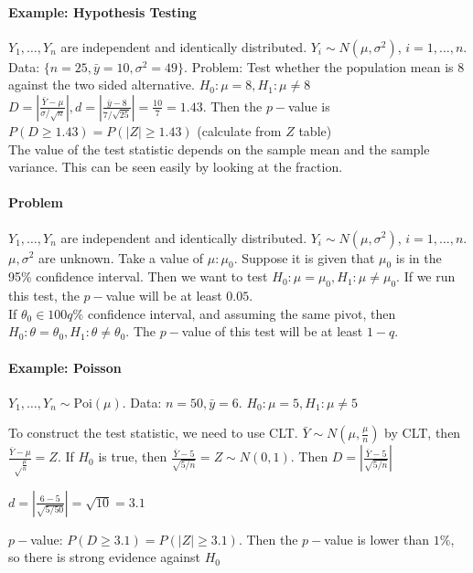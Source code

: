 \documentclass[10pt,letter]{article}
\theoremstyle{plain}
\theoremstyle{definition}
\begin{document}
\paragraph{Example: Hypothesis Testing}
$Y_1,\ldots,Y_n$ are independent and identically distributed. $Y_i\sim N(\mu,\sigma^2)$, $i=1,\ldots,n$. Data: $\lbrace n=25,\bar{y}=10,\sigma^2=49\rbrace$. Problem: Test whether the population mean is $8$ against the two sided alternative. $H_0:\mu=8,H_1:\mu\neq8$\\
$D=\left|\frac{\bar{Y}-\mu}{\sigma/\sqrt{n}}\right|, d=\left|\frac{\bar{y}-8}{7/\sqrt{25}}\right|=\frac{10}{7}=1.43$. Then the $p-$value is $P(D\geq1.43)=P(|Z|\geq1.43)$ (calculate from $Z$ table) \\ 
The value of the test statistic depends on the sample mean and the sample variance. This can be seen easily by looking at the fraction. 
\paragraph{Problem}
$Y_1,\ldots,Y_n$ are independent and identically distributed. $Y_i\sim N(\mu,\sigma^2)$, $i=1,\ldots,n$. $\mu,\sigma^2$ are unknown. Take a value of $\mu:\mu_0$. Suppose it is given that $\mu_0$ is in the 95\% confidence interval. Then we want to test $H_0:\mu=\mu_0,H_1:\mu\neq\mu_0$. If we run this test, the $p-$value will be at least $0.05$. \\ 
If $\theta_0\in100q\%$ confidence interval, and assuming the same pivot, then $H_0:\theta=\theta_0,H_1:\theta\neq\theta_0$. The $p-$value of this test will be at least $1-q$. 
\paragraph{Example: Poisson}
$Y_1,\ldots,Y_n\sim\text{Poi}(\mu)$. Data: $n=50,\bar{y}=6$. $H_0:\mu=5,H_1:\mu\neq5$\\ 
\begin{steps}
     \item To construct the test statistic, we need to use CLT. $\bar{Y}\sim N\left(\mu,\frac{\mu}{n}\right)$ by CLT, then $\frac{\bar{Y}-\mu}{\sqrt\frac{\mu}{n}}=Z$. If $H_0$ is true, then $\frac{\bar{Y}-5}{\sqrt{5/n}}=Z\sim N(0,1)$. Then $D=\left|\frac{\bar{Y}-5}{\sqrt{5/n}}\right|$ 
     \item $d=\left\lvert\frac{6-5}{\sqrt{5/50}}\right\rvert=\sqrt{10}=3.1$ 
     \item $p-$value: $P(D\geq3.1)=P(|Z|\geq3.1)$. Then the $p-$value is lower than $1\%$, so there is strong evidence against $H_0$ 
\end{steps}
\end{document}
